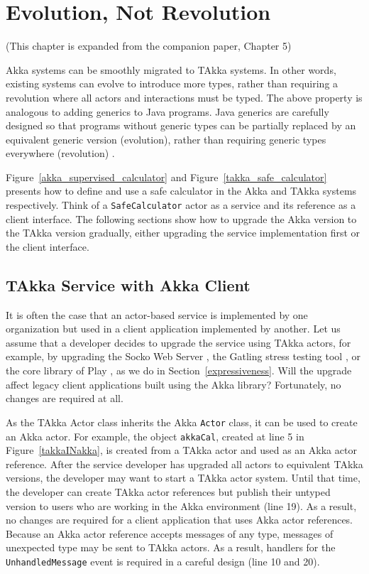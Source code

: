 \chapter{Evolution, Not Revolution }
\label{evolution}

\begin{center}
(This chapter is expanded from the companion paper, Chapter 5)
\end{center}
\vspace{12 pt}

Akka systems can be smoothly migrated to TAkka systems. In other words, 
existing systems can evolve to introduce more types, rather than requiring a 
revolution where all actors and interactions must be typed.
The above property is analogous to adding generics to Java programs.  Java 
generics are carefully designed so that programs without generic types can be 
partially replaced by an equivalent generic version (evolution), rather than 
requiring generic types everywhere (revolution) \citep{JGC}.

Figure~\ref{akka_supervised_calculator} and Figure~\ref{takka_safe_calculator} 
presents how to define and use a safe calculator
in the Akka and TAkka systems respectively.  Think of a {\tt SafeCalculator} actor
as a service and its reference as a client interface.  The following sections show how to upgrade
the Akka version to the TAkka version gradually, either upgrading the 
service implementation first or the client interface.


\section{TAkka Service with Akka Client}

It is often the case that an actor-based service is implemented by one 
organization but used in a client application implemented by another.  
Let us assume that a developer decides to upgrade the service 
using TAkka actors, for example, by upgrading the Socko Web Server 
\citep{SOCKO}, the Gatling stress testing tool \citep{Gatling}, or the core 
library of Play \citep{play_doc}, as we do in Section~\ref{expressiveness}.  
Will the upgrade affect legacy client applications
built using the Akka library?  Fortunately, no changes are required at all.

As the TAkka {Actor} class inherits the Akka {\tt Actor} class, it can be used 
to create an Akka actor.  For example, the object {\tt akkaCal}, created at line 
5 in Figure~\ref{takkaINakka}, is created from a TAkka actor and used as an Akka
actor reference.  After the service developer has upgraded all actors to equivalent 
TAkka versions, the developer may want to start a TAkka actor system.  Until that
time, the developer can create TAkka actor references but publish their untyped
version to users who are working in the Akka environment (line 19).
As a result, no changes are required for a client 
application that uses Akka actor references.  Because an Akka actor reference 
accepts messages of any type, messages of unexpected type may be sent to TAkka actors.  
As a result, handlers for the {\tt UnhandledMessage} event is required in a
careful design (line 10 and 20).


